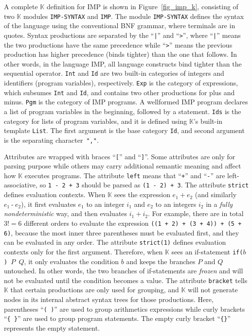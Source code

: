 \documentclass[acmsmall,review,anonymous]{acmart}
\newcommand{\K}{$\mathbb{K}$\xspace}
\newcommand{\ttInt}{\texttt{Int}\xspace}
\newcommand{\ttId}{\texttt{Id}\xspace}
\newcommand{\ttExp}{\texttt{Exp}\xspace}
\newcommand{\ttplus}{\ \texttt{+}\ }
\newcommand{\ttminus}{\ \texttt{-}\ }
\begin{document}
A complete \K definition for IMP is shown in Figure~\ref{fig_imp_k},
consisting of two \K modules \texttt{IMP-SYNTAX} and \texttt{IMP}.
The module \texttt{IMP-SYNTAX} defines the syntax of the language
using the conventional BNF grammar, where terminals are in quotes.
Syntax productions are separated by the ``\texttt{|}'' and ``\texttt{>}'',
where ``\texttt{|}'' means the two productions have the same
precedence while ``\texttt{>}'' means the previous production
has higher precedence (binds tighter) than the one that follows.
In other words, in the language IMP,
all language constructs bind tighter than the sequential operator.
\ttInt and \ttId are two built-in
categories of integers and identifiers (program variables),
respectively.
\ttExp is the category of expressions, which subsumes
\ttInt and \ttId, and contains two other productions for plus and minus.
\texttt{Pgm} is the category of IMP programs.
A wellformed IMP program declares a list of program variables
in the beginning, followed by a statement.
\texttt{Ids} is the category for lists of program variables, and
it is defined using \K's built-in template \texttt{List}.
The first argument is the base category \texttt{Id},
and second argument is the separating character~\texttt{","}.

Attributes are wrapped with braces ``\texttt{[}'' and ``\texttt{]}''.
Some attributes are only for parsing purpose while others may carry 
additional semantic meaning and affect how \K executes programs.
The attribute \texttt{left} means that ``\texttt{+}'' and ``\texttt{-}''
are left-associative, so \texttt{1 - 2 + 3} should be parsed as
\texttt{(1 - 2) + 3}.
The attribute \texttt{strict} defines evaluation contexts.
When \K sees the expression
$e_1 \ttplus e_2$ (and similarly $e_1 \ttminus e_2$),
it first evaluates $e_1$ to an integer $i_1$
and $e_2$ to an integers $i_2$ in a \emph{fully nondeterministic} way,
and then evaluates $i_1 + i_2$.
For example, there are in total $3! = 6$
different orders to evaluate the expression
\texttt{((1 + 2) + (3 + 4)) + (5 + 6)},
because the most inner three parentheses must be evaluated first, 
and they can be evaluated in any order.
The attribute \texttt{strict(1)} defines evaluation contexts only 
for the first argument.
Therefore, when \K sees an if-statement \texttt{if($b$) $P$ $Q$},
it only evaluates the condition $b$ and
keeps the branches $P$ and $Q$ untouched.
In other words, the two branches of if-statements are \emph{frozen} and will
not be evaluated until the condition becomes a value.
The attribute \texttt{bracket} tells \K that certain productions are
only used for grouping, and \K will not generate nodes in its internal
abstract syntax trees for those productions.
Here, parentheses ``\texttt{( )}'' are used to 
group arithmetics expressions while
curly brackets ``\verb|{ }|'' are used to group program statements.
The empty curly bracket ``\verb|{}|'' represents
the empty statement.
\end{document}

